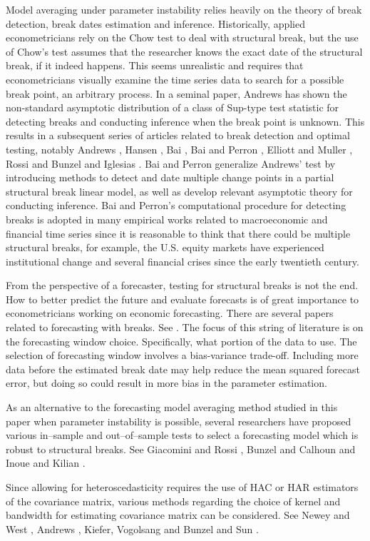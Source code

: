 Model averaging under parameter instability relies heavily on the theory of break detection, break dates estimation and inference. Historically, applied econometricians rely on the Chow test to deal with structural break, but the use of Chow's test assumes that the researcher knows the exact date of the structural break, if it indeed happens. This seems unrealistic and requires that econometricians visually examine the time series data to search for a possible break point, an arbitrary process. In a seminal paper, Andrews \cite{andrews93} has shown the non-standard asymptotic distribution of a class of Sup-type test statistic for detecting breaks and conducting inference when the break point is unknown. This results in a subsequent series of articles related to break detection and optimal testing, notably Andrews \cite{andrews_ploberger94} \cite{andrews2003}, Hansen \cite{hansen_JE2000}, Bai \cite{bai_ET1997} \cite{bai_JE1999}, Bai and Perron \cite{bai_perron98}, Elliott and Muller \cite{elliott_muller_RES2006}, Rossi \cite{rossi_ET2005} and Bunzel and Iglesias \cite{bunzel_iglesias}. Bai and Perron \cite{bai_perron98} generalize Andrews' test by introducing methods to detect and date multiple change points in a partial structural break linear model, as well as develop relevant asymptotic theory for conducting inference. Bai and Perron's computational procedure for detecting breaks is adopted in many empirical works related to macroeconomic and financial time series since it is reasonable to think that there could be multiple structural breaks, for example, the U.S. equity markets have experienced institutional change and several financial crises since the early twentieth century.

From the perspective of a forecaster, testing for structural breaks is not the end. How to better predict the future and evaluate forecasts is of great importance to econometricians working on economic forecasting. There are several papers related to forecasting with breaks. See \cite{pesaran_timmermann_JE2007} \cite{pesaran_pick_pranovich_2011}. The focus of this string of literature is on the forecasting window choice. Specifically, what portion of the data to use. The selection of forecasting window involves a bias-variance trade-off. Including more data before the estimated break date may help reduce the mean squared forecast error, but doing so could result in more bias in the parameter estimation.

As an alternative to the forecasting model averaging method studied in this paper when parameter instability is possible, several researchers have proposed various in--sample and out--of--sample tests to select a forecasting model which is robust to structural breaks. See Giacomini and Rossi \cite{giacomini_rossi_2008} \cite{giacomini_rossi_2010}, Bunzel and Calhoun \cite{bunzel_calhoun_2012} and Inoue and Kilian \cite{inoue_kilian_ER2004}.

Since allowing for heteroscedasticity requires the use of HAC or HAR estimators of the covariance matrix, various methods regarding the choice of kernel and bandwidth for estimating covariance matrix can be considered. See Newey and West \cite{newey_west_EMETRICA1987}, Andrews \cite{andrews91}, Kiefer, Vogolsang and Bunzel \cite{kvb2000} and Sun \cite{sunyixiao_2010}. 